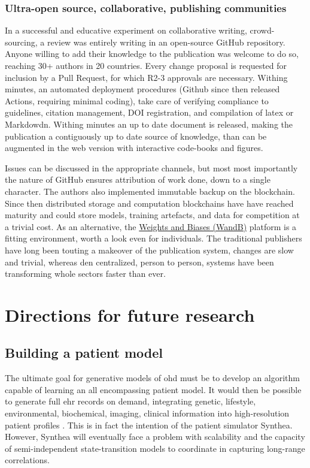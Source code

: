 \subsubsection{Ultra-open source, collaborative, publishing communities}
In a successful and educative experiment on collaborative writing, crowd-sourcing, a review was entirely writing in an open-source GitHub repository. Anyone willing to add their knowledge to the publication was welcome to do so, reaching 30+ authors in 20 countries. Every change proposal is requested for inclusion by a Pull Request, for which R2-3 approvals are necessary. Withing minutes, an automated deployment procedures (Github since then released Actions, requiring minimal coding), take care of verifying compliance to guidelines, citation management, DOI registration, and compilation of latex or Markdowdn. Withing minutes an up to date document is released, making the publication a contiguously up to date source of knowledge, than can be augmented in the web version with interactive code-books and figures.\par
Issues can be discussed in the appropriate channels, but most most importantly the nature of GitHub ensures attribution of work done, down to a single character. The authors also implemented immutable backup on the blockchain. Since then distributed storage and computation blockchains have have reached maturity and could store models, training artefacts, and data for competition at a trivial cost. As an alternative,  the \href{http://bit.ly/WandB-ML}{Weights and Biases (WandB)} platform is a fitting environment, worth a look even for individuals. The traditional publishers have long been touting a makeover of the publication system, changes are slow and trivial, whereas den centralized, person to person, systems have been transforming whole sectors faster than ever.\\







\section{Directions for future research}
\subsection{Building a patient model}
The ultimate goal for generative models of \gls{ohd} must be to develop an algorithm capable of learning an all encompassing patient model. It would then be possible to generate full \gls{ehr} records on demand, integrating genetic, lifestyle, environmental, biochemical, imaging, clinical information into high-resolution patient profiles \cite{Capobianco2020}. This is in fact the intention of the patient simulator Synthea. However, Synthea will eventually face a problem with scalability and the capacity of semi-independent state-transition models to coordinate in capturing long-range correlations.\par


